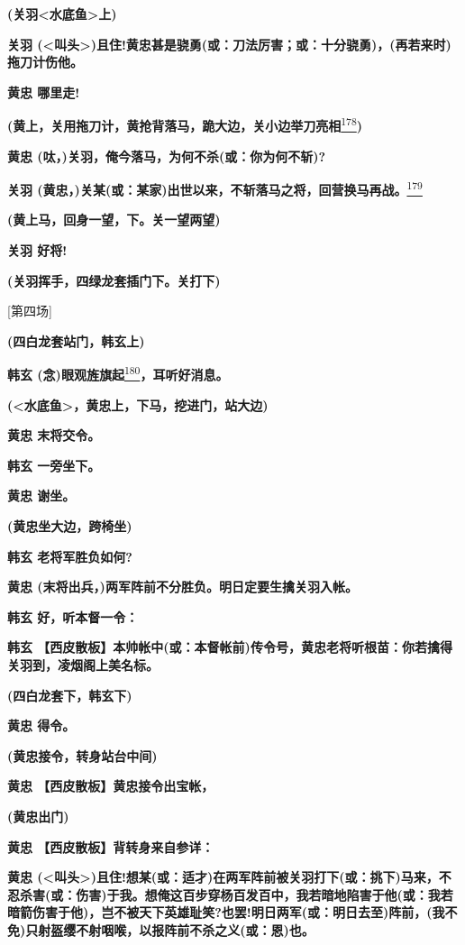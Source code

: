 \textbf{(关羽\textless{}水底鱼\textgreater{}上)}

\textbf{关羽
(\textless{}叫头\textgreater{})且住!黄忠甚是骁勇(或：刀法厉害；或：十分骁勇)，(再若来时)拖刀计伤他。}

\textbf{黄忠 哪里走!}

\textbf{(黄上，关用拖刀计，黄抢背落马，跪大边，关小边举刀亮相}\protect\hyperlink{fn178}{\textsuperscript{178}}\textbf{)}

\textbf{黄忠 (呔，)关羽，俺今落马，为何不杀(或：你为何不斩)?}

\textbf{关羽
(黄忠，)关某(或：某家)出世以来，不斩落马之将，回营换马再战。}\protect\hyperlink{fn179}{\textsuperscript{179}}

\textbf{(黄上马，回身一望，下。关一望两望)}

\textbf{关羽 好将!}

\textbf{(关羽挥手，四绿龙套插门下。关打下)}

{[}第四场{]}

\textbf{(四白龙套站门，韩玄上)}

\textbf{韩玄
(念)眼观旌旗起}\protect\hyperlink{fn180}{\textsuperscript{180}}\textbf{，耳听好消息。}

\textbf{(\textless{}水底鱼\textgreater{}，黄忠上，下马，挖进门，站大边)}

\textbf{黄忠 末将交令。}

\textbf{韩玄 一旁坐下。}

\textbf{黄忠 谢坐。}

\textbf{(黄忠坐大边，跨椅坐)}

\textbf{韩玄 老将军胜负如何?}

\textbf{黄忠 (末将出兵，)两军阵前不分胜负。明日定要生擒关羽入帐。}

\textbf{韩玄 好，听本督一令：}

\textbf{韩玄
【西皮散板】本帅帐中(或：本督帐前)传令号，黄忠老将听根苗：你若擒得关羽到，凌烟阁上美名标。}

\textbf{(四白龙套下，韩玄下)}

\textbf{黄忠 得令。}

\textbf{(黄忠接令，转身站台中间)}

\textbf{黄忠 【西皮散板】黄忠接令出宝帐，}

\textbf{(黄忠出门)}

\textbf{黄忠 【西皮散板】背转身来自参详：}

\textbf{黄忠
(\textless{}叫头\textgreater{})且住!想某(或：适才)在两军阵前被关羽打下(或：挑下)马来，不忍杀害(或：伤害)于我。想俺这百步穿杨百发百中，我若暗地陷害于他(或：我若暗箭伤害于他)，岂不被天下英雄耻笑?也罢!明日两军(或：明日去至)阵前，(我不免)只射盔缨不射咽喉，以报阵前不杀之义(或：恩)也。}

